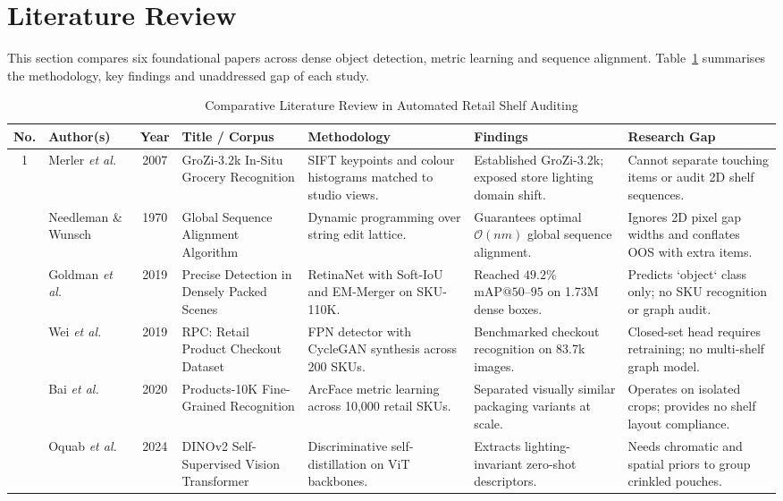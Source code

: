 \documentclass[10pt,a4paper]{article}
\begin{document}
\section{Literature Review}
This section compares six foundational papers across dense object detection, metric learning and sequence alignment. Table~\ref{tab:lncs_lit} summarises the methodology, key findings and unaddressed gap of each study.

\begin{table}[h]
\centering
\caption{Comparative Literature Review in Automated Retail Shelf Auditing}
\label{tab:lncs_lit}
\scriptsize
\begin{tabularx}{\textwidth}{c l c p{2.3cm} p{2.5cm} p{2.4cm} X}
\toprule
\textbf{No.} & \textbf{Author(s)} & \textbf{Year} & \textbf{Title / Corpus} & \textbf{Methodology} & \textbf{Findings} & \textbf{Research Gap} \\
\midrule
1 & Merler \textit{et al.}~\cite{merler2007grozi} & 2007 & GroZi-3.2k In-Situ Grocery Recognition & SIFT keypoints and colour histograms matched to studio views. & Established GroZi-3.2k; exposed store lighting domain shift. & Cannot separate touching items or audit 2D shelf sequences. \\
\addlinespace[2pt]
2 & Needleman \& Wunsch~\cite{needleman1970general} & 1970 & Global Sequence Alignment Algorithm & Dynamic programming over string edit lattice. & Guarantees optimal $\mathcal{O}(nm)$ global sequence alignment. & Ignores 2D pixel gap widths and conflates OOS with extra items. \\
\addlinespace[2pt]
3 & Goldman \textit{et al.}~\cite{goldman2019precise} & 2019 & Precise Detection in Densely Packed Scenes & RetinaNet with Soft-IoU and EM-Merger on SKU-110K. & Reached $49.2\%$ $\text{mAP}@50\text{--}95$ on 1.73M dense boxes. & Predicts `object` class only; no SKU recognition or graph audit. \\
\addlinespace[2pt]
4 & Wei \textit{et al.}~\cite{wei2019rpc} & 2019 & RPC: Retail Product Checkout Dataset & FPN detector with CycleGAN synthesis across 200 SKUs. & Benchmarked checkout recognition on 83.7k images. & Closed-set head requires retraining; no multi-shelf graph model. \\
\addlinespace[2pt]
5 & Bai \textit{et al.}~\cite{bai2020products10k} & 2020 & Products-10K Fine-Grained Recognition & ArcFace metric learning across 10,000 retail SKUs. & Separated visually similar packaging variants at scale. & Operates on isolated crops; provides no shelf layout compliance. \\
\addlinespace[2pt]
6 & Oquab \textit{et al.}~\cite{oquab2023dinov2} & 2024 & DINOv2 Self-Supervised Vision Transformer & Discriminative self-distillation on ViT backbones. & Extracts lighting-invariant zero-shot descriptors. & Needs chromatic and spatial priors to group crinkled pouches. \\
\bottomrule
\end{tabularx}
\end{table}
\end{document}

